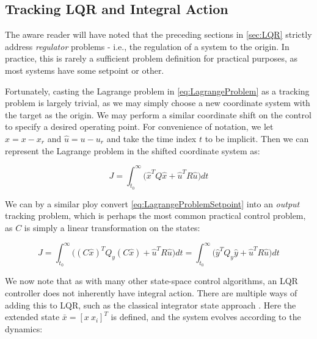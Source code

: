 \subsection{Tracking LQR and Integral Action}\label{subsec:TrackingAndIntegralAction}

The aware reader will have noted that the preceding sections in \cref{sec:LQR} strictly address \textit{regulator} problems - i.e., the regulation of a system to the origin. In practice, this is rarely a sufficient problem definition for practical purposes, as most systems have some setpoint or other. 

Fortunately, casting the Lagrange problem in \cref{eq:LagrangeProblem} as a tracking problem is largely trivial, as we may simply choose a new coordinate system with the target as the origin. We may perform a similar coordinate shift on the control to specify a desired operating point. For convenience of notation, we let $\hat{x} = x-x_r$ and $\hat{u} = u-u_r$ and take the time index $t$ to be implicit. Then we can represent the Lagrange problem in the shifted coordinate system as:

\begin{equation}\label{eq:LagrangeProblemSetpoint}
	J = \int_{t_0}^{\infty} \big(\hat{x}^TQ\hat{x} + \hat{u}^TR\hat{u}\big)dt
\end{equation} 

We can by a similar ploy convert \cref{eq:LagrangeProblemSetpoint} into an \textit{output} tracking problem, which is perhaps the most common practical control problem, as $C$ is simply a linear transformation on the states:

\begin{equation}\label{eq:LagrangeProblemOutput}
	J = \int_{t_0}^{\infty} \big((C\hat{x})^TQ_y(C\hat{x}) + \hat{u}^TR\hat{u}\big)dt = \int_{t_0}^{\infty} \big(\hat{y}^TQ_y\hat{y} + \hat{u}^TR\hat{u}\big)dt
\end{equation} 

We now note that as with many other state-space control algorithms, an LQR controller does not inherently have integral action. There are multiple ways of adding this to LQR, such as the classical integrator state approach \cite{Skogestad2005}. Here the extended state $\bar{x} = [x \ x_i]^T$ is defined, and the system evolves according to the dynamics:

